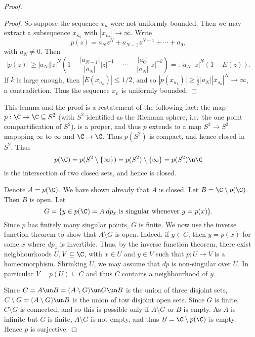 \documentclass[12pt]{article}
\begin{document}
\begin{proof}
\begin{proof}
So suppose the sequence $x_n$ were not uniformly bounded. Then we may extract a subsequence $x_{n_k}$ with $|x_{n_k}| \to \infty$. Write
\[p(z) =a_Nz^N + a_{N-1}z^{N-1} + \cdots + a_0,\] with $a_N \neq 0$. Then
\[|p(z)| \geq |a_N||z|^N\left(1-\frac{|a_{N-1}|}{|a_N|}|z|^{-1}- \cdots - \frac{|a_{0}|}{|a_N|}|z|^{-k}\right) =: |a_N||z|^N(1-E(z)).\]
If $k$ is large enough, then $|E(x_{n_k})| \leq 1/2$, and so $|p(x_{n_k})| \geq \frac{1}{2}|a_N||x_{n_k}|^N \to \infty$, a contradiction. Thus the sequence $x_n$ is uniformly bounded.\end{proof}
\begin{rk}This lemma and the proof is a restatement of the following fact: the map $p:\C \to \C \subseteq S^2$ (with $S^2$ identified as the Riemann sphere, i.e.\ the one point compactification of $S^2$), is a proper, and thus $p$ extends to a map $S^2 \to S^2$ mappping $\infty$ to $\infty$ and $\C \to \C$. Thus $p(S^2)$ is compact, and hence closed in $S^2$. Thus 
\[p(\C) = p(S^2 \setminus \{\infty\}) = p(S^2)\setminus \{\infty\} = p(S^2)\n \C\] is the intersection of two closed sets, and hence is closed.\end{rk}

Denote $A = p(\C)$. We have shown already that $A$ is closed. Let $B = \C\setminus p(\C)$. Then $B$ is open.  Let
\[G =  \{y \in p(\C)=A \: dp_x\text{ is singular whenever } y = p(x)\}.\] Since $p$ has finitely many singular points, $G$ is finite.  We now use the inverse function theorem to show that $A\setminus G$ is open.  Indeed, if $y \in C$, then $y = p(x)$ for some $x$ where $dp_x$ is invertible. Thus, by the inverse function theorem, there exist neigbhourhoods $U,V \subseteq \C$, with $x \in U$ and $y \in V$ such that $p:U \to V$ is a homeomorphism.  Shrinking $U$, we may assume that $dp$ is non-singular over $U$.  In particular $V = p(U) \subseteq C$ and thus $C$ contains a neighbourhood of $y$.

Since $C = A\un B =  (A\setminus G) \un G \un B$ is the union of three disjoint sets,  $C\setminus G = (A\setminus G) \un B$ is the union of tow disjoint open sets.  Since $G$ is finite,  $C\setminus G$ is connected,  and so this is possible only if $A\setminus G$ or $B$ is empty.  As $A$ is infinite but $G$ is finite,  $A\setminus G$ is not empty,  and thus $B = \C\setminus p(\C)$ is empty.  Hence $p$ is surjective.
\end{proof}

\begin{bibdiv}
\begin{biblist}

\newcommand{\perafter}[1]{#1.}


\end{biblist}
\end{bibdiv}
\end{document}

